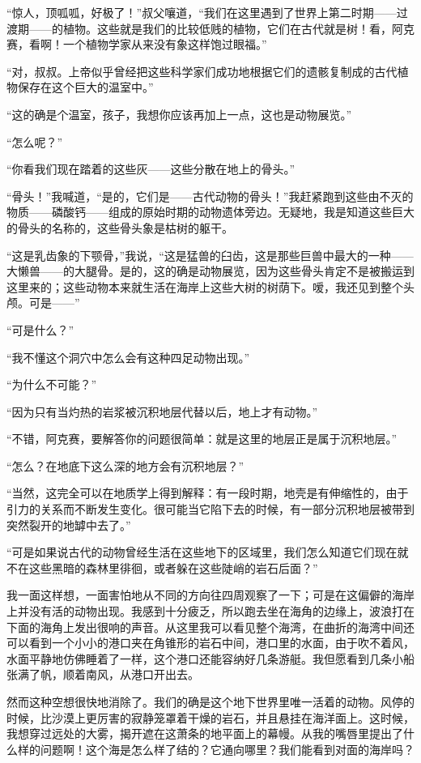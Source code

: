 \documentclass[10pt]{book}
\begin{document}
“惊人，顶呱呱，好极了！”叔父嚷道，“我们在这里遇到了世界上第二时期——过渡期——的植物。这些就是我们的比较低贱的植物，它们在古代就是树！看，阿克赛，看啊！一个植物学家从来没有象这样饱过眼福。”

“对，叔叔。上帝似乎曾经把这些科学家们成功地根据它们的遗骸复制成的古代植物保存在这个巨大的温室中。”

“这的确是个温室，孩子，我想你应该再加上一点，这也是动物展览。”

“怎么呢？”

“你看我们现在踏着的这些灰——这些分散在地上的骨头。”

“骨头！”我喊道，“是的，它们是——古代动物的骨头！”我赶紧跑到这些由不灭的物质——磷酸钙——组成的原始时期的动物遗体旁边。无疑地，我是知道这些巨大的骨头的名称的，这些骨头象是枯树的躯干。

“这是乳齿象的下颚骨，”我说，“这是猛兽的臼齿，这是那些巨兽中最大的一种——大懒兽——的大腿骨。是的，这的确是动物展览，因为这些骨头肯定不是被搬运到这里来的；这些动物本来就生活在海岸上这些大树的树荫下。嗳，我还见到整个头颅。可是——”

“可是什么？”

“我不懂这个洞穴中怎么会有这种四足动物出现。”

“为什么不可能？”

“因为只有当灼热的岩浆被沉积地层代替以后，地上才有动物。”

“不错，阿克赛，要解答你的问题很简单：就是这里的地层正是属于沉积地层。”

“怎么？在地底下这么深的地方会有沉积地层？”

“当然，这完全可以在地质学上得到解释：有一段时期，地壳是有伸缩性的，由于引力的关系而不断发生变化。很可能当它陷下去的时候，有一部分沉积地层被带到突然裂开的地罅中去了。”

“可是如果说古代的动物曾经生活在这些地下的区域里，我们怎么知道它们现在就不在这些黑暗的森林里徘徊，或者躲在这些陡峭的岩石后面？”

我一面这样想，一面害怕地从不同的方向往四周观察了一下；可是在这偏僻的海岸上并没有活的动物出现。我感到十分疲乏，所以跑去坐在海角的边缘上，波浪打在下面的海角上发出很响的声音。从这里我可以看见整个海湾，在曲折的海湾中间还可以看到一个小小的港口夹在角锥形的岩石中间，港口里的水面，由于吹不着风，水面平静地仿佛睡着了一样，这个港口还能容纳好几条游艇。我但愿看到几条小船张满了帆，顺着南风，从港口开出去。

然而这种空想很快地消除了。我们的确是这个地下世界里唯一活着的动物。风停的时候，比沙漠上更厉害的寂静笼罩着干燥的岩石，并且悬挂在海洋面上。这时候，我想穿过远处的大雾，揭开遮在这萧条的地平面上的幕幔。从我的嘴唇里提出了什么样的问题啊！这个海是怎么样了结的？它通向哪里？我们能看到对面的海岸吗？
\end{document}
